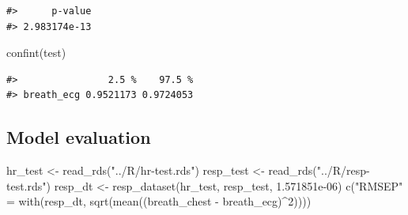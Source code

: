 \documentclass[
]{article}
\newenvironment{Shaded}{\begin{snugshade}}{\end{snugshade}}
\newcommand{\AttributeTok}[1]{\textcolor[rgb]{0.77,0.63,0.00}{#1}}
\newcommand{\ConstantTok}[1]{\textcolor[rgb]{0.00,0.00,0.00}{#1}}
\newcommand{\DecValTok}[1]{\textcolor[rgb]{0.00,0.00,0.81}{#1}}
\newcommand{\FloatTok}[1]{\textcolor[rgb]{0.00,0.00,0.81}{#1}}
\newcommand{\FunctionTok}[1]{\textcolor[rgb]{0.00,0.00,0.00}{#1}}
\newcommand{\NormalTok}[1]{#1}
\newcommand{\OtherTok}[1]{\textcolor[rgb]{0.56,0.35,0.01}{#1}}
\newcommand{\SpecialCharTok}[1]{\textcolor[rgb]{0.00,0.00,0.00}{#1}}
\newcommand{\StringTok}[1]{\textcolor[rgb]{0.31,0.60,0.02}{#1}}
\begin{document}
\begin{Shaded}
\end{Shaded}

\begin{verbatim}
#>      p-value 
#> 2.983174e-13
\end{verbatim}

\begin{Shaded}
\begin{Highlighting}[]
\FunctionTok{confint}\NormalTok{(test)}
\end{Highlighting}
\end{Shaded}

\begin{verbatim}
#>                2.5 %    97.5 %
#> breath_ecg 0.9521173 0.9724053
\end{verbatim}

\hypertarget{model-evaluation-1}{%
\subsection{Model evaluation}\label{model-evaluation-1}}

\begin{Shaded}
\begin{Highlighting}[]
\NormalTok{hr\_test }\OtherTok{\textless{}{-}} \FunctionTok{read\_rds}\NormalTok{(}\StringTok{"../R/hr{-}test.rds"}\NormalTok{)}
\NormalTok{resp\_test }\OtherTok{\textless{}{-}} \FunctionTok{read\_rds}\NormalTok{(}\StringTok{"../R/resp{-}test.rds"}\NormalTok{)}
\NormalTok{resp\_dt }\OtherTok{\textless{}{-}} \FunctionTok{resp\_dataset}\NormalTok{(hr\_test, resp\_test, }\FloatTok{1.571851e{-}06}\NormalTok{)}
\FunctionTok{c}\NormalTok{(}\StringTok{"RMSEP"} \OtherTok{=} \FunctionTok{with}\NormalTok{(resp\_dt, }\FunctionTok{sqrt}\NormalTok{(}\FunctionTok{mean}\NormalTok{((breath\_chest }\SpecialCharTok{{-}}\NormalTok{ breath\_ecg)}\SpecialCharTok{\^{}}\DecValTok{2}\NormalTok{))))}
\end{Highlighting}
\end{Shaded}
\end{document}
